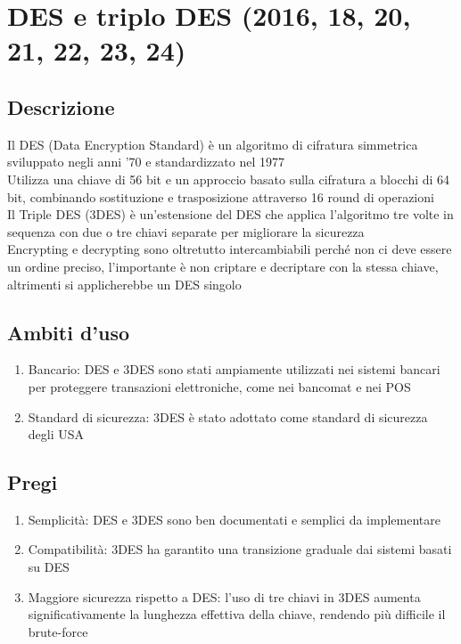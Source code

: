 \documentclass[10pt,oneside,a4paper]{article}
\begin{document}
\section{DES e triplo DES (2016, 18, 20, 21, 22, 23, 24)}
\subsection{Descrizione}
Il DES (Data Encryption Standard) è un algoritmo di cifratura simmetrica sviluppato negli anni '70 e standardizzato nel 1977\\
Utilizza una chiave di 56 bit e un approccio basato sulla cifratura a blocchi di 64 bit, combinando sostituzione e trasposizione attraverso 16 round di operazioni\\
Il Triple DES (3DES) è un'estensione del DES che applica l'algoritmo tre volte in sequenza con due o tre chiavi separate per migliorare la sicurezza\\
Encrypting e decrypting sono oltretutto intercambiabili perché non ci deve essere un ordine preciso, l'importante è non criptare e decriptare con la stessa chiave, altrimenti si applicherebbe un DES singolo
\subsection{Ambiti d'uso}
\begin{enumerate}
\item Bancario: DES e 3DES sono stati ampiamente utilizzati nei sistemi bancari per proteggere transazioni elettroniche, come nei bancomat e nei POS
\item Standard di sicurezza: 3DES è stato adottato come standard di sicurezza degli USA
\end{enumerate}
\subsection{Pregi}
\begin{enumerate}
\item Semplicità: DES e 3DES sono ben documentati e semplici da implementare
\item Compatibilità: 3DES ha garantito una transizione graduale dai sistemi basati su DES
\item Maggiore sicurezza rispetto a DES: l'uso di tre chiavi in 3DES aumenta significativamente la lunghezza effettiva della chiave, rendendo più difficile il brute-force
\end{enumerate}
\end{document}
